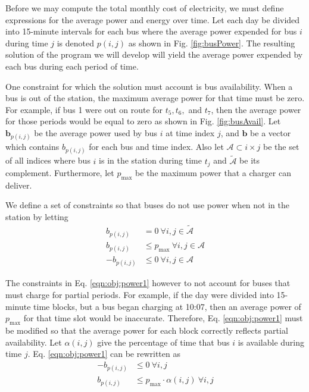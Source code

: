 Before we may compute the total monthly cost of electricity, we must define expressions for the average power and energy over time.  Let each day be divided into 15-minute intervals for each bus where the average power expended for bus $i$ during time $j$ is denoted $p(i,j)$ as shown in Fig. \ref{fig:busPower}. The resulting solution of the program we will develop will yield the average power expended by each bus during each period of time.
\par One constraint for which the solution must account is bus availability.  When a bus is out of the station, the maximum average power for that time must be zero. For example, if bus 1 were out on route for $t_5, t_6,$ and $t_7$, then the average power for those periods would be equal to zero as shown in Fig. \ref{fig:busAvail}. Let $\bm{b}_{p(i,j)}$ be the average power used by bus $i$ at time index $j$, and $\bm{b}$ be a vector which contains $b_{p(i,j)}$ for each bus and time index. Also let $\mathcal{A} \subset {i\times j}$  be the set of all indices where bus $i$ is in the station during time $t_j$ and $\tilde{\mathcal{A}}$ be its complement. Furthermore, let $p_{\text{max}}$ be the maximum power that a charger can deliver. 
\par We define a set of constraints so that buses do not use power when not in the station by letting
\begin{equation}\label{eqn:obj:power1}\begin{aligned}
	b_{p(i,j)} &= 0 \ \forall i,j \in \tilde{\mathcal{A}}  \\
	b_{p(i,j)} &\le p_{\text{max}} \ \forall i,j \in \mathcal{A} \\
	-b_{p(i,j)} &\le 0              \ \forall i,j \in \mathcal{A} 
\end{aligned}\end{equation}
\par The constraints in Eq. \ref{eqn:obj:power1} however to not account for buses that must charge for partial periods.  For example, if the day were divided into 15-minute time blocks, but a bus began charging at 10:07, then an average power of $p_{\text{max}}$ for that time slot would be inaccurate. Therefore, Eq. \ref{eqn:obj:power1} must be modified so that the average power for each block correctly reflects partial availability.  Let $\alpha(i,j)$ give the percentage of time that bus $i$ is available during time $j$. Eq. \ref{eqn:obj:power1} can be rewritten as
\begin{equation}\label{eqn:obj:power2}\begin{aligned}
	-b_{p(i,j)} &\le 0 \ \forall i,j \\
	b_{p(i,j)}  &\le p_{\text{max}}\cdot \alpha(i,j) \ \forall  i,j\\
\end{aligned}\end{equation}



